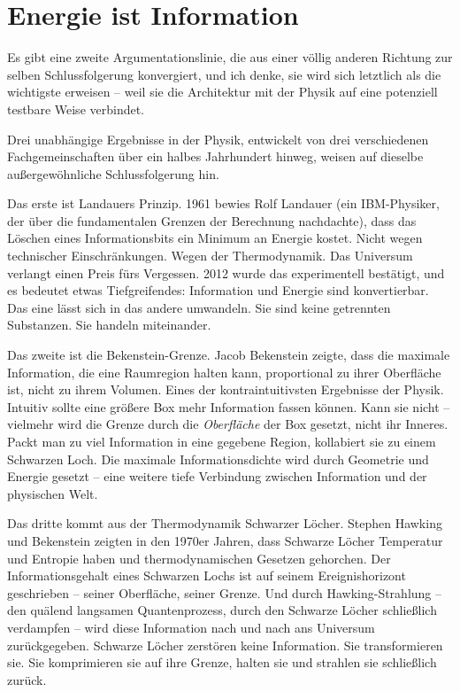 \documentclass[11pt, twoside, openright]{book}
\begin{document}
\section*{Energie ist Information}

Es gibt eine zweite Argumentationslinie, die aus einer völlig anderen Richtung zur selben Schlussfolgerung konvergiert, und ich denke, sie wird sich letztlich als die wichtigste erweisen -- weil sie die Architektur mit der Physik auf eine potenziell testbare Weise verbindet.

Drei unabhängige Ergebnisse in der Physik, entwickelt von drei verschiedenen Fachgemeinschaften über ein halbes Jahrhundert hinweg, weisen auf dieselbe außergewöhnliche Schlussfolgerung hin.

Das erste ist Landauers Prinzip. 1961 bewies Rolf Landauer (ein IBM-Physiker, der über die fundamentalen Grenzen der Berechnung nachdachte), dass das Löschen eines Informationsbits ein Minimum an Energie kostet. Nicht wegen technischer Einschränkungen. Wegen der Thermodynamik. Das Universum verlangt einen Preis fürs Vergessen. 2012 wurde das experimentell bestätigt, und es bedeutet etwas Tiefgreifendes: Information und Energie sind konvertierbar. Das eine lässt sich in das andere umwandeln. Sie sind keine getrennten Substanzen. Sie handeln miteinander.

Das zweite ist die Bekenstein-Grenze. Jacob Bekenstein zeigte, dass die maximale Information, die eine Raumregion halten kann, proportional zu ihrer Oberfläche ist, nicht zu ihrem Volumen. Eines der kontraintuitivsten Ergebnisse der Physik. Intuitiv sollte eine größere Box mehr Information fassen können. Kann sie nicht -- vielmehr wird die Grenze durch die \textit{Oberfläche} der Box gesetzt, nicht ihr Inneres. Packt man zu viel Information in eine gegebene Region, kollabiert sie zu einem Schwarzen Loch. Die maximale Informationsdichte wird durch Geometrie und Energie gesetzt -- eine weitere tiefe Verbindung zwischen Information und der physischen Welt.

Das dritte kommt aus der Thermodynamik Schwarzer Löcher. Stephen Hawking und Bekenstein zeigten in den 1970er Jahren, dass Schwarze Löcher Temperatur und Entropie haben und thermodynamischen Gesetzen gehorchen. Der Informationsgehalt eines Schwarzen Lochs ist auf seinem Ereignishorizont geschrieben -- seiner Oberfläche, seiner Grenze. Und durch Hawking-Strahlung -- den quälend langsamen Quantenprozess, durch den Schwarze Löcher schließlich verdampfen -- wird diese Information nach und nach ans Universum zurückgegeben. Schwarze Löcher zerstören keine Information. Sie transformieren sie. Sie komprimieren sie auf ihre Grenze, halten sie und strahlen sie schließlich zurück.
\end{document}
